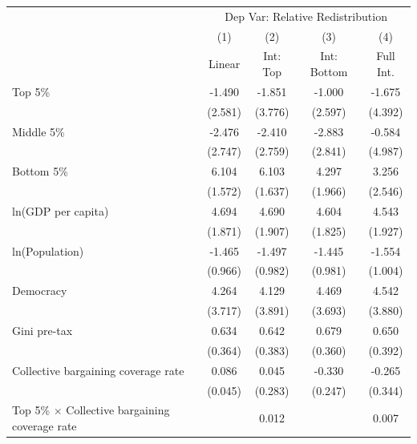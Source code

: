 \begin{tabular}{l*{4}{c}}
\toprule
                    &\multicolumn{4}{c}{Dep Var: Relative Redistribution}\\
                    &\multicolumn{1}{c}{(1)}&\multicolumn{1}{c}{(2)}&\multicolumn{1}{c}{(3)}&\multicolumn{1}{c}{(4)}\\
                    &\multicolumn{1}{c}{Linear}&\multicolumn{1}{c}{Int: Top}&\multicolumn{1}{c}{Int: Bottom}&\multicolumn{1}{c}{Full Int.}\\
\midrule
Top 5\%             &      -1.490&      -1.851&      -1.000&      -1.675\\
                    &     (2.581)&     (3.776)&     (2.597)&     (4.392)\\
\addlinespace
Middle 5\%          &      -2.476&      -2.410&      -2.883&      -0.584\\
                    &     (2.747)&     (2.759)&     (2.841)&     (4.987)\\
\addlinespace
Bottom 5\%          &       6.104&       6.103&       4.297&       3.256\\
                    &     (1.572)&     (1.637)&     (1.966)&     (2.546)\\
\addlinespace
ln(GDP per capita)  &       4.694&       4.690&       4.604&       4.543\\
                    &     (1.871)&     (1.907)&     (1.825)&     (1.927)\\
\addlinespace
ln(Population)      &      -1.465&      -1.497&      -1.445&      -1.554\\
                    &     (0.966)&     (0.982)&     (0.981)&     (1.004)\\
\addlinespace
Democracy           &       4.264&       4.129&       4.469&       4.542\\
                    &     (3.717)&     (3.891)&     (3.693)&     (3.880)\\
\addlinespace
Gini pre-tax        &       0.634&       0.642&       0.679&       0.650\\
                    &     (0.364)&     (0.383)&     (0.360)&     (0.392)\\
\addlinespace
Collective bargaining coverage rate&       0.086&       0.045&      -0.330&      -0.265\\
                    &     (0.045)&     (0.283)&     (0.247)&     (0.344)\\
\addlinespace
Top 5\% $\times$ Collective bargaining coverage rate&            &       0.012&            &       0.007\\

\end{tabular}
